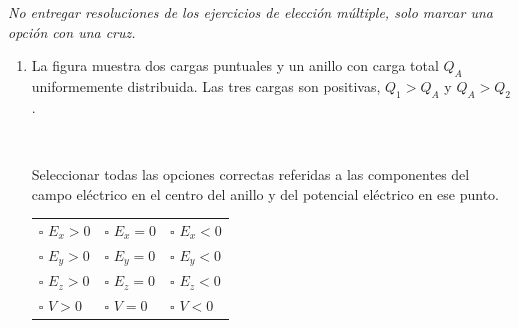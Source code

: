 \documentclass[a4paper,11pt,dvipsnames]{article}
\begin{document}


\textit{No entregar resoluciones de los ejercicios de elección múltiple, solo marcar una opción con una cruz.}

\begin{enumerate}[leftmargin=*]
\item
\begin{minipage}[t]{.4\textwidth}
La figura muestra dos cargas puntuales y un anillo con carga total $Q_A$ uniformemente distribuida. Las tres cargas son positivas, $Q_1>Q_A$ y $Q_A>Q_2$.
\begin{center}
\end{center}
\end{minipage}
\begin{minipage}[t]{.05\textwidth}
~    
\end{minipage}
\begin{minipage}[t]{.5\textwidth}
Seleccionar todas las opciones correctas referidas a las componentes del campo eléctrico en el centro del anillo y del potencial eléctrico en ese punto.\\
\begin{tabularx}{\textwidth}{XXX}
$\square$ $E_x > 0$ & $\square$ $E_x = 0$ & $\square$ $E_x < 0$ \\
$\square$ $E_y > 0$ & $\square$ $E_y = 0$ & $\square$ $E_y < 0$\\
$\square$ $E_z > 0$ & $\square$ $E_z = 0$ & $\square$ $E_z < 0$\\
$\square$ $V > 0$ & $\square$ $V = 0$ & $\square$ $V < 0$
\end{tabularx}
\end{minipage}



\end{enumerate}
\end{document}
